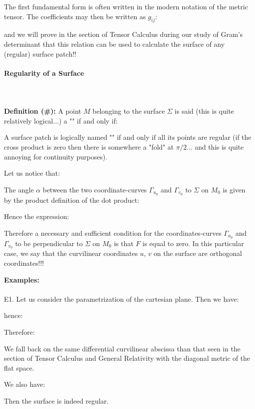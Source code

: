 {	The first fundamental form is often written in the modern notation of the metric tensor. The coefficients may then be written as $g_{ij}$:
	
	and we will prove in the section of Tensor Calculus during our study of Gram's determinant that this relation can be used to calculate the surface of any (regular) surface patch!!
	
	\pagebreak
	\paragraph{Regularity of a Surface}\mbox{}\\\\
	\textbf{Definition (\#\mydef):} A point $M$ belonging to the surface $\Sigma$ is said (this is quite relatively logical...) a "" if and only if:
	
	A surface patch is logically named "" if and only if all its points are regular (if the cross product is zero then there is somewhere a "fold" at $\pi/2$... and this is quite annoying for continuity purposes).

	Let us notice that:
	
	The angle $\alpha$ between the two coordinate-curves $\Gamma_{u_0}$ and $\Gamma_{v_0}$ to $\Sigma$ on $M_0$ is given by the product definition of the dot product:
	
		Hence the expression:
	
	Therefore a necessary and sufficient condition for the coordinates-curves $\Gamma_{u_0}$ and $\Gamma_{v_0}$ to be perpendicular to $\Sigma$ on $M_0$ is that $F$ is equal to zero. In this particular case, we say that the curvilinear coordinates $u$, $v$ on the surface are orthogonal coordinates!!!
	\begin{tcolorbox}[colframe=black,colback=white,sharp corners]
	\textbf{{\Large {}}Examples:}\\\\
	E1. Let us consider the parametrization of the cartesian plane. Then we have:
	
	hence:
	
	Therefore:
	
	We fall back on the same differential curvilinear abscissa than that seen in the section of Tensor Calculus and General Relativity with the diagonal metric of the flat space.
	
	We also have:
	
	Then the surface is indeed regular. \\


\end{tcolorbox}}
